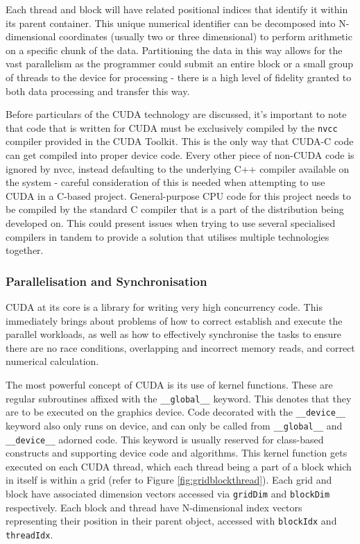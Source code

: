 \documentclass[conference]{IEEEtran}
\begin{document}
Each thread and block will have related positional indices that identify it within its parent container. This unique numerical identifier can be decomposed into N-dimensional coordinates (usually two or three dimensional) to perform arithmetic on a specific chunk of the data. Partitioning the data in this way allows for the vast parallelism as the programmer could submit an entire block or a small group of threads to the device for processing - there is a high level of fidelity granted to both data processing and transfer this way.

Before particulars of the CUDA technology are discussed, it's important to note that code that is written for CUDA must be exclusively compiled by the \texttt{nvcc} compiler provided in the CUDA Toolkit. This is the only way that CUDA-C code can get compiled into proper device code. Every other piece of non-CUDA code is ignored by nvcc, instead defaulting to the underlying C++ compiler available on the system - careful consideration of this is needed when attempting to use CUDA in a C-based project. General-purpose CPU code for this project needs to be compiled by the standard C compiler that is a part of the distribution being developed on. This could present issues when trying to use several specialised compilers in tandem to provide a solution that utilises multiple technologies together.

\subsubsection{Parallelisation and Synchronisation}

CUDA at its core is a library for writing very high concurrency code. This immediately brings about problems of how to correct establish and execute the parallel workloads, as well as how to effectively synchronise the tasks to ensure there are no race conditions, overlapping and incorrect memory reads, and correct numerical calculation.

The most powerful concept of CUDA is its use of kernel functions. These are regular subroutines affixed with the \texttt{\_\_global\_\_} keyword. This denotes that they are to be executed on the graphics device. Code decorated with the \texttt{\_\_device\_\_} keyword also only runs on device, and can only be called from \texttt{\_\_global\_\_} and \texttt{\_\_device\_\_} adorned code. This keyword is usually reserved for class-based constructs and supporting device code and algorithms. This kernel function gets executed on each CUDA thread, which each thread being a part of a block which in itself is within a grid (refer to Figure \ref{fig:gridblockthread}). Each grid and block have associated dimension vectors accessed via \texttt{gridDim} and \texttt{blockDim} respectively. Each block and thread have N-dimensional index vectors representing their position in their parent object, accessed with \texttt{blockIdx} and \texttt{threadIdx}.
\end{document}
